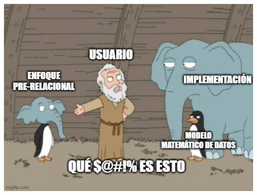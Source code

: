 {
{
    \includegraphics[width=\paperwidth,height=\paperheight]{img/prerelational.jpg}
}
\begin{frame}
\end{frame}
}

